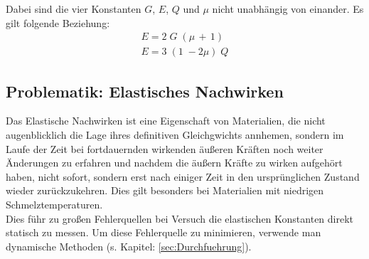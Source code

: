 Dabei sind die vier Konstanten $G$, $E$, $Q$ und $\mu$ nicht unabhängig von einander.
Es gilt folgende Beziehung:
\begin{gather}
    E = 2\;G\;(\mu\,+\,1) \\
    E = 3\;(1\;-2\mu)\;Q
    \label{eqn:Beziehung}
\end{gather}


\subsection{Problematik: Elastisches Nachwirken}
Das Elastische Nachwirken ist eine Eigenschaft von Materialien, die nicht augenblicklich die Lage ihres definitiven 
Gleichgwichts annhemen, sondern im Laufe der Zeit bei fortdauernden wirkenden äußeren Kräften noch weiter Änderungen zu
erfahren und nachdem die äußern Kräfte zu wirken aufgehört haben, nicht sofort, sondern erst nach einiger Zeit in den 
ursprünglichen Zustand wieder zurückzukehren.\cite{elastisches_Nachwirken}
Dies gilt besonders bei Materialien mit niedrigen Schmelztemperaturen.\\
Dies führ zu großen Fehlerquellen bei Versuch die elastischen Konstanten direkt statisch 
zu messen.\newline
Um diese Fehlerquelle zu minimieren, verwende man dynamische Methoden (s. Kapitel: \ref{sec:Durchfuehrung}).
\label{sec:nachwirken_vorb}


\label{sec:Theorie}
